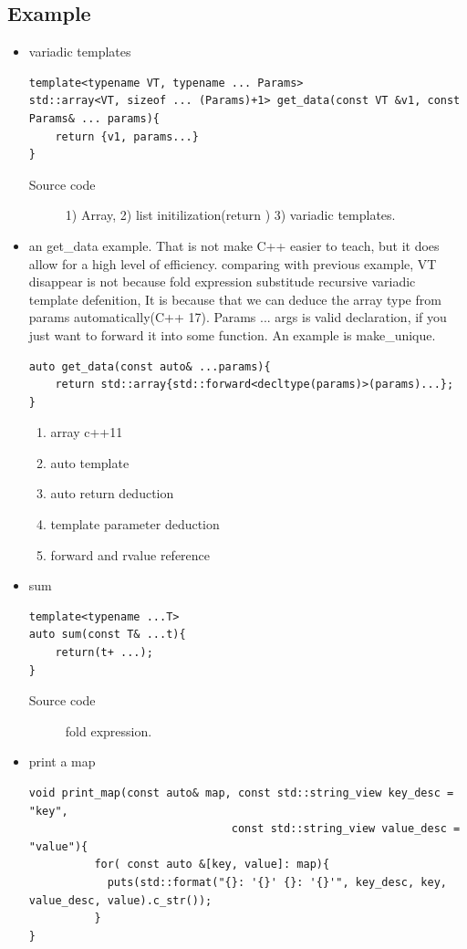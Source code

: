 \documentclass[a4paper,11pt,twoside]{book}
\begin{document}
\subsection{Example}
\begin{itemize}
	\item variadic templates
\begin{lstlisting}
template<typename VT, typename ... Params>
std::array<VT, sizeof ... (Params)+1> get_data(const VT &v1, const Params& ... params){
	return {v1, params...}
}
\end{lstlisting}	
\begin{description}
	\item[Source code] 1) Array, 2) list initilization(return ) 3) variadic templates.  
\end{description}



\item an get\_data example. That is not make C++ easier to teach, but it does allow for a high level of efficiency. comparing with previous example, VT disappear is not because fold expression substitude recursive variadic template defenition, It is because that we can deduce the array type from params automatically(C++ 17). Params ... args is valid declaration, if you just want to forward it into some function. An example is make\_unique. 
\begin{lstlisting}
auto get_data(const auto& ...params){
	return std::array{std::forward<decltype(params)>(params)...};
}
\end{lstlisting}
\begin{enumerate}
	\item array c++11
	\item auto template
	\item auto return deduction
	\item template parameter deduction
	\item forward and rvalue reference
\end{enumerate}	

\item sum 
\begin{lstlisting}
template<typename ...T>
auto sum(const T& ...t){
	return(t+ ...);
}
\end{lstlisting}
\begin{description}
		\item[Source code] fold expression.
\end{description}

	\item print a map
\begin{lstlisting}
void print_map(const auto& map, const std::string_view key_desc = "key",
							   const std::string_view value_desc = "value"){
		  for( const auto &[key, value]: map){
		  	puts(std::format("{}: '{}' {}: '{}'", key_desc, key, value_desc, value).c_str());
		  }		   
}
\end{lstlisting}	


\end{itemize}
\end{document}
